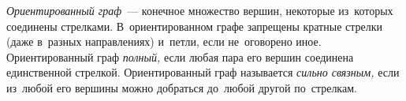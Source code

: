 \resetproblem \begingroup %
    \def\jeolmdate{1 июня 2018 г., пара 3}%
    \def\jeolmgroupname{Группа 9-3}%
    \def\jeolmauthors{Кушнир А., Тихонов~Ю.}%
\jeolmheader \endgroup



\emph{Ориентированный граф}~--- конечное множество вершин, некоторые из~которых
соединены стрелками.
В~ориентированном графе запрещены кратные стрелки (даже в~разных направлениях)
и~петли, если не~оговорено иное.
Ориентированный граф \emph{полный,} если любая пара его вершин соединена
единственной стрелкой.
Ориентированный граф называется \emph{сильно связным,} если из~любой его
вершины можно добраться до~любой другой по~стрелкам.

